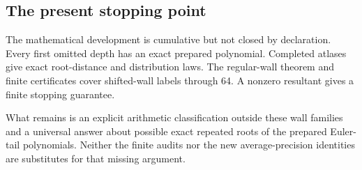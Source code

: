 \documentclass[11pt,letterpaper]{article}
\begin{document}
\subsection{The present stopping point}\label{the-present-stopping-point}

The mathematical development is cumulative but not closed by declaration. Every first omitted depth has an exact prepared polynomial. Completed atlases give exact root-distance and distribution laws. The regular-wall theorem and finite certificates cover shifted-wall labels through 64. A nonzero resultant gives a finite stopping guarantee.

What remains is an explicit arithmetic classification outside these wall families and a universal answer about possible exact repeated roots of the prepared Euler-tail polynomials. Neither the finite audits nor the new average-precision identities are substitutes for that missing argument.
\end{document}
